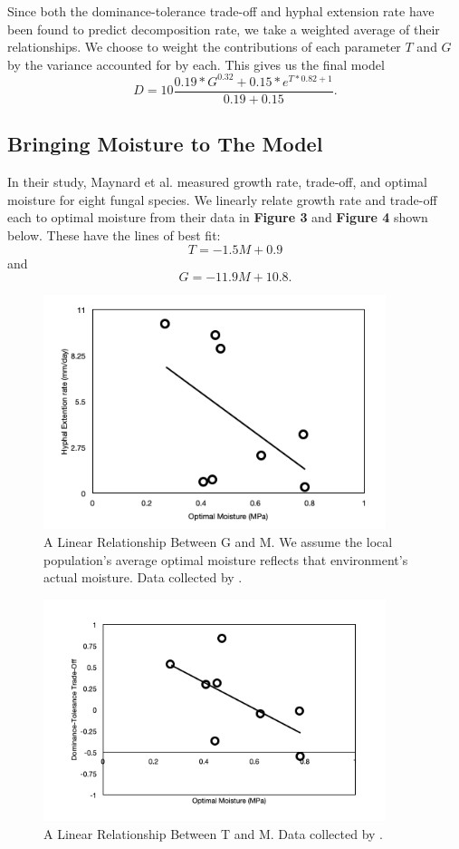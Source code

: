 \documentclass[12pt]{article}
\begin{document}
Since both the dominance-tolerance trade-off and hyphal extension rate have been found to predict decomposition rate, we take a weighted average of their relationships. We choose to weight the contributions of each parameter $T$ and $G$ by the variance accounted for by each. This gives us the final model 
\[
D = 10 \frac{0.19*G^{0.32} + 0.15 * e^{T*0.82+1}}{0.19+0.15}. 
\]

\subsection{Bringing Moisture to The Model}


In their study, Maynard et al. measured growth rate, trade-off, and optimal moisture for eight fungal species. We linearly relate growth rate and trade-off each to optimal moisture from their data in 
\textbf{Figure 3} and \textbf{Figure 4} shown below. 
These have the lines of best fit:
\[
T = -1.5 M + 0.9
\]
and 
\[
G = -11.9 M + 10.8.
\]

\begin{figure}[h!]
\begin{center}
\includegraphics[width=10cm]{MtoG.png}
\caption{A Linear Relationship Between G and M. We assume the local population's average optimal moisture reflects that environment's actual moisture. Data collected by \cite{source25}.}
\end{center}
\end{figure}

\begin{figure}[h!]
\begin{center}
\includegraphics[width=10cm]{MtoT.png}
\caption{A Linear Relationship Between T and M. Data collected by \cite{source25}.}
\end{center}
\end{figure}
\end{document}
